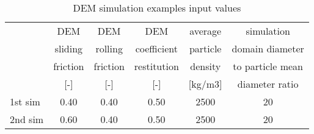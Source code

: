 \begin{table}[h]
\centering
\begin{tabular}{l|c|c|c|c|c}
\hline
          & DEM   & DEM   & DEM   & average & simulation \\
          & sliding & rolling & coefficient & particle & domain diameter \\
          & friction & friction & restitution & density & to particle mean \\
          & [-]   & [-]   & [-]   & [kg/m3] & diameter ratio \\
          \hline
    1st sim & 0.40  & 0.40  & 0.50  & 2500  & 20 \\
    \hline
    2nd sim & 0.60  & 0.40  & 0.50  & 2500  & 20 \\


\hline
\end{tabular}
\caption{DEM simulation examples input values}
\label{tab:11DEMSimExampleinputvalues}
\end{table}